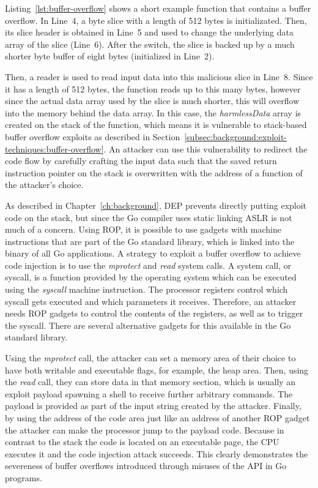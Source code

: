 Listing~\ref{lst:buffer-overflow} shows a short example function that contains a buffer overflow.
In Line~4, a byte slice with a length of 512 bytes is initializated.
Then, its slice header is obtained in Line~5 and used to change the underlying data array of the slice (Line~6).
After the switch, the slice is backed up by a much shorter byte buffer of eight bytes (initialized in Line~2).



Then, a reader is used to read input data into this malicious slice in Line~8.
Since it has a length of 512 bytes, the function reads up to this many bytes, however since the actual data array used
by the slice is much shorter, this will overflow into the memory behind the data array.
In this case, the \textit{harmlessData} array is created on the stack of the function, which means it is vulnerable to
stack-based buffer overflow exploits as described in Section~\ref{subsec:background:exploit-techniques:buffer-overflow}.
An attacker can use this vulnerability to redirect the code flow by carefully crafting the input data such that the
saved return instruction pointer on the stack is overwritten with the address of a function of the attacker's choice.

As described in Chapter~\ref{ch:background}, \acrshort{DEP} prevents directly putting exploit code on the stack, but
since the Go compiler uses static linking \acrshort{ASLR} is not much of a concern.
Using \acrshort{ROP}, it is possible to use gadgets with machine instructions that are part of the Go standard library,
which is linked into the binary of all Go applications.
A strategy to exploit a buffer overflow to achieve code injection is to use the \textit{mprotect} and \textit{read}
system calls.
A system call, or syscall, is a function provided by the operating system which can be executed using the
\textit{syscall} machine instruction.
The processor registers control which syscall gets executed and which parameters it receives.
Therefore, an attacker needs \acrshort{ROP} gadgets to control the contents of the registers, as well as to trigger
the syscall.
There are several alternative gadgets for this available in the Go standard library.

Using the \textit{mprotect} call, the attacker can set a memory area of their choice to have both writable and
executable flags, for example, the heap area.
Then, using the \textit{read} call, they can store data in that memory section, which is usually an exploit payload
spawning a shell to receive further arbitrary commands.
The payload is provided as part of the input string created by the attacker.
Finally, by using the address of the code area just like an address of another \acrshort{ROP} gadget the attacker can
make the processor jump to the payload code.
Because in contrast to the stack the code is located on an executable page, the \acrshort{CPU} executes it and the code
injection attack succeeds.
This clearly demonstrates the severeness of buffer overflows introduced through misuses of the \unsafe{} \acrshort{API}
in Go programs.

